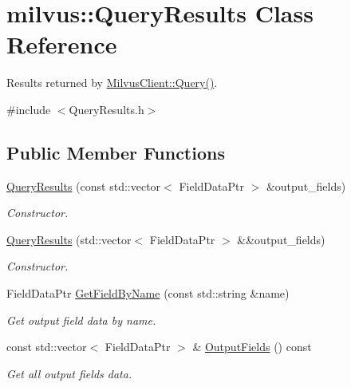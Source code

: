 \hypertarget{classmilvus_1_1_query_results}{}\section{milvus\+:\+:Query\+Results Class Reference}
\label{classmilvus_1_1_query_results}


Results returned by \hyperlink{classmilvus_1_1_milvus_client_a2c27e3b681313329ccf491867d717182}{Milvus\+Client\+::\+Query()}.  




{\ttfamily \#include $<$Query\+Results.\+h$>$}

\subsection*{Public Member Functions}
\begin{DoxyCompactItemize}
\item 
\mbox{\label{classmilvus_1_1_query_results_af13d366e422443d57279ce6496832477}} 
\hyperlink{classmilvus_1_1_query_results_af13d366e422443d57279ce6496832477}{Query\+Results} (const std\+::vector$<$ Field\+Data\+Ptr $>$ \&output\+\_\+fields)
\begin{DoxyCompactList}\small\item\em Constructor. \end{DoxyCompactList}\item 
\mbox{\label{classmilvus_1_1_query_results_aca6a847eab4bdb8fb94b81d8d2ff37a4}} 
\hyperlink{classmilvus_1_1_query_results_aca6a847eab4bdb8fb94b81d8d2ff37a4}{Query\+Results} (std\+::vector$<$ Field\+Data\+Ptr $>$ \&\&output\+\_\+fields)
\begin{DoxyCompactList}\small\item\em Constructor. \end{DoxyCompactList}\item 
\mbox{\label{classmilvus_1_1_query_results_affd16dfdba2961667c8974eb18f30a01}} 
Field\+Data\+Ptr \hyperlink{classmilvus_1_1_query_results_affd16dfdba2961667c8974eb18f30a01}{Get\+Field\+By\+Name} (const std\+::string \&name)
\begin{DoxyCompactList}\small\item\em Get output field data by name. \end{DoxyCompactList}\item 
\mbox{\label{classmilvus_1_1_query_results_a2a18ada4e506488d702cabb992241802}} 
const std\+::vector$<$ Field\+Data\+Ptr $>$ \& \hyperlink{classmilvus_1_1_query_results_a2a18ada4e506488d702cabb992241802}{Output\+Fields} () const
\begin{DoxyCompactList}\small\item\em Get all output fields data. \end{DoxyCompactList}\end{DoxyCompactItemize}


